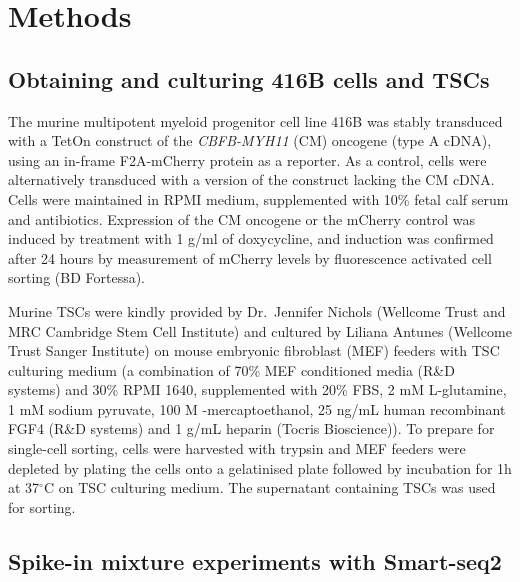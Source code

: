 \documentclass{article}
\begin{document}
\section*{Methods}

\subsection*{Obtaining and culturing 416B cells and TSCs}

The murine multipotent myeloid progenitor cell line 416B \autocite{dexter1979isolation} was stably transduced with a TetOn construct of the \textit{CBFB-MYH11} (CM) oncogene (type A cDNA), using an in-frame F2A-mCherry protein as a reporter. 
As a control, cells were alternatively transduced with a version of the construct lacking the CM cDNA. 
Cells were maintained in RPMI medium, supplemented with 10\% fetal calf serum and antibiotics.
Expression of the CM oncogene or the mCherry control was induced by treatment with 1 \textmu{}g/ml of doxycycline, and induction was confirmed after 24 hours by measurement of mCherry levels by fluorescence activated cell sorting (BD Fortessa).

Murine TSCs were kindly provided by Dr.\ Jennifer Nichols (Wellcome Trust and MRC Cambridge Stem Cell Institute) and cultured by Liliana Antunes (Wellcome Trust Sanger Institute) on mouse embryonic fibroblast (MEF) feeders with TSC culturing medium (a combination of 70\% MEF conditioned media (R\&D systems) and 30\% RPMI 1640, supplemented with 20\% FBS, 2 mM L-glutamine, 1 mM sodium pyruvate, 100 \textmu{}M \textbeta{}-mercaptoethanol, 25 ng/mL human recombinant FGF4 (R\&D systems) and 1 \textmu{}g/mL heparin (Tocris Bioscience)). 
To prepare for single-cell sorting, cells were harvested with trypsin and MEF feeders were depleted by plating the cells onto a gelatinised plate followed by incubation for 1h at 37$^{\circ}$C on TSC culturing medium. 
The supernatant containing TSCs was used for sorting.

\subsection*{Spike-in mixture experiments with Smart-seq2}
\end{document}
